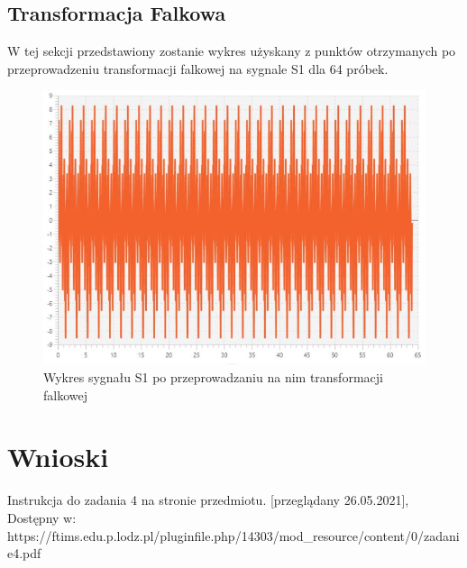 \documentclass[12pt]{article}
\begin{document}
\subsection{Transformacja Falkowa}
W tej sekcji przedstawiony zostanie wykres użyskany z punktów otrzymanych po przeprowadzeniu transformacji falkowej na sygnale S1 dla 64 próbek.
\begin{figure}[H]
	\centering
	\includegraphics[width=\linewidth]{falkowa-s1}
	\caption{Wykres sygnału S1 po przeprowadzaniu na nim transformacji falkowej}
	\label{S3_sygnal}
\end{figure}


\section{Wnioski}

\begin{thebibliography}{}
 Instrukcja do zadania 4 na stronie przedmiotu. [przeglądany 26.05.2021], Dostępny w: https://ftims.edu.p.lodz.pl/pluginfile.php/14303/mod\_resource/content/0/zadanie4.pdf


\end{thebibliography}
\end{document}
